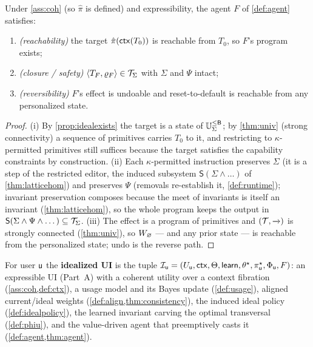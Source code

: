 \documentclass[../uxoxo-main]{subfiles}
\begin{document}
\begin{theorem}\label{thm:agent}
Under \cref{ass:coh} (so $\hat\pi$ is defined) and expressibility, the agent $F$
of \cref{def:agent} satisfies:
\begin{enumerate}[label=\textup{(\roman*)}, leftmargin=*, itemsep=1pt]
  \item \emph{(reachability)} the target $\hat\pi(\mathsf{ctx}(T_0))$ is reachable from
        $T_0$, so $F$'s program exists;
  \item \emph{(closure / safety)} $\langle T_F,\varrho_F\rangle\in\mathcal{T}_\Sigma$
        with $\Sigma$ and $\Psi$ intact;
  \item \emph{(reversibility)} $F$'s effect is undoable and reset-to-default is
        reachable from any personalized state.
\end{enumerate}
\end{theorem}

\begin{proof}
(i) By \cref{prop:idealexists} the target is a state of $\mathbb{U}_{\Sigma}^{\le \mathsf{B}}$; by
\cref{thm:univ} (strong connectivity) a sequence of primitives carries $T_0$ to
it, and restricting to $\kappa$-permitted primitives still suffices because the
target satisfies the capability constraints by construction. (ii) Each
$\kappa$-permitted instruction preserves $\Sigma$ (it is a step of the restricted
editor, the induced subsystem $\mathsf S(\Sigma\wedge\dots)$ of
\cref{thm:latticehom}) and preserves $\Psi$ (removals re-establish it,
\cref{def:runtime}); invariant preservation composes because the meet of
invariants is itself an invariant (\cref{thm:latticehom}), so the whole program
keeps the output in $\mathsf S(\Sigma\wedge\Psi\wedge\dots)\subseteq\mathcal{T}_\Sigma$.
(iii) The effect is a program of primitives and $(\mathcal{T},\xrightarrow{\,\,})$ is strongly
connected (\cref{thm:univ}), so $W_{\varnothing}$ --- and any prior state --- is reachable
from the personalized state; undo is the reverse path.
\end{proof}

\begin{definition}\label{def:idealui}
For user $\mathsf{u}$ the \textbf{idealized UI} is the tuple
$\mathcal I_{\mathsf{u}}=(U_{\mathsf{u}},\mathsf{ctx},\Theta,\mathsf{learn},\theta^\star,\pi^\star_{\mathsf{u}},\Phi_{\mathsf{u}},F)$:
an expressible UI (Part~A) with a coherent utility over a context fibration
(\cref{ass:coh,def:ctx}), a usage model and its Bayes update
(\cref{def:usage}), aligned current/ideal weights (\cref{def:align,thm:consistency}),
the induced ideal policy (\cref{def:idealpolicy}), the learned invariant carving
the optimal transversal (\cref{def:phiu}), and the value-driven agent that
preemptively casts it (\cref{def:agent,thm:agent}).
\end{definition}
\end{document}

